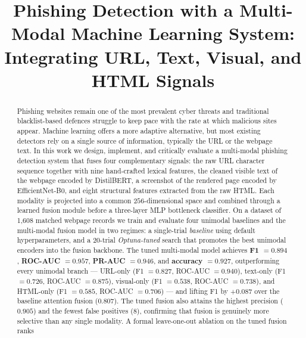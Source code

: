 \documentclass[conference]{IEEEtran}
\begin{document}
\title{Phishing Detection with a Multi-Modal Machine Learning System:\\
Integrating URL, Text, Visual, and HTML Signals}

\author{
}

\maketitle

\begin{abstract}
Phishing websites remain one of the most prevalent cyber threats and
traditional blacklist-based defences struggle to keep pace with the
rate at which malicious sites appear. Machine learning offers a more
adaptive alternative, but most existing detectors rely on a single
source of information, typically the URL or the webpage text. In this
work we design, implement, and critically evaluate a multi-modal
phishing detection system that fuses four complementary signals: the
raw URL character sequence together with nine hand-crafted lexical
features, the cleaned visible text of the webpage encoded by
DistilBERT, a screenshot of the rendered page encoded by
EfficientNet-B0, and eight structural features extracted from the raw
HTML. Each modality is projected into a common $256$-dimensional
space and combined through a learned fusion module before a
three-layer MLP bottleneck classifier. On a dataset of 1{,}608
matched webpage records we train and evaluate four unimodal baselines
and the multi-modal fusion model in two regimes: a
single-trial \emph{baseline} using default hyperparameters, and a
20-trial \emph{Optuna-tuned} search that promotes the best unimodal
encoders into the fusion backbone.  The tuned multi-modal model
achieves \textbf{F1 $=0.894$}, \textbf{ROC-AUC $=0.957$},
\textbf{PR-AUC $=0.946$}, and \textbf{accuracy $=0.927$}, outperforming
every unimodal branch --- URL-only (F1 $=0.827$, ROC-AUC $=0.940$),
text-only (F1 $=0.726$, ROC-AUC $=0.875$), visual-only
(F1 $=0.538$, ROC-AUC $=0.738$), and HTML-only (F1 $=0.585$,
ROC-AUC $=0.706$) --- and lifting F1 by $+0.087$ over the
baseline attention fusion ($0.807$).  The tuned fusion also attains
the highest precision ($0.905$) and the fewest false positives (8),
confirming that fusion is genuinely more selective than any single
modality.  A formal leave-one-out ablation on the tuned fusion ranks

\end{abstract}
\end{document}
